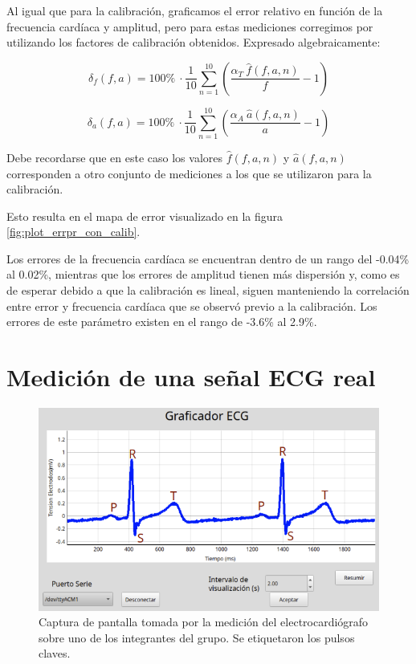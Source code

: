 \documentclass[conference]{IEEEtran}
\begin{document}
Al igual que para la calibración, graficamos el error relativo en función de 
la frecuencia cardíaca y amplitud, pero para estas mediciones corregimos por
utilizando los factores de calibración obtenidos. Expresado algebraicamente:

$$ \delta_{f} \left(f, a\right) = 100 \% ~ \cdot \dfrac{1}{10} \sum_{n=1}^{10}
\left( \dfrac{\alpha_T ~ \hat{f}(f,a,n)}{f} - 1\right)$$
 

$$ \delta_{a} \left(f, a\right) = 100 \% ~ \cdot \dfrac{1}{10} \sum_{n=1}^{10}
\left( \dfrac{\alpha_A ~ \hat{a}(f,a,n)}{a} - 1\right)$$

Debe recordarse que en este caso los valores $\hat{f}(f,a,n)$ y $\hat{a}(f,a,n)$
corresponden a otro conjunto de mediciones a los que se utilizaron para la
calibración.

Esto resulta en el mapa de error visualizado en la figura
\ref{fig:plot_errpr_con_calib}.

Los errores de la frecuencia cardíaca se encuentran dentro de un rango del
-0.04\% al 0.02\%, mientras que los errores de amplitud tienen más dispersión y,
como es de esperar debido a que la calibración es lineal, siguen manteniendo la
correlación entre error y frecuencia cardíaca que se observó previo a la
calibración. Los errores de este parámetro existen en el rango de -3.6\% al
2.9\%.
 
\section{Medición de una señal ECG real}



\begin{figure}[tb]
    \centering
    \includegraphics[width=\linewidth]{figs/graficador_ecg_etiquetado.png}
    \caption{Captura de pantalla tomada por la medición del electrocardiógrafo
    sobre  uno de los integrantes del grupo. Se etiquetaron los pulsos claves.}
    \label{fig:ecg_real}
\end{figure}
\end{document}
